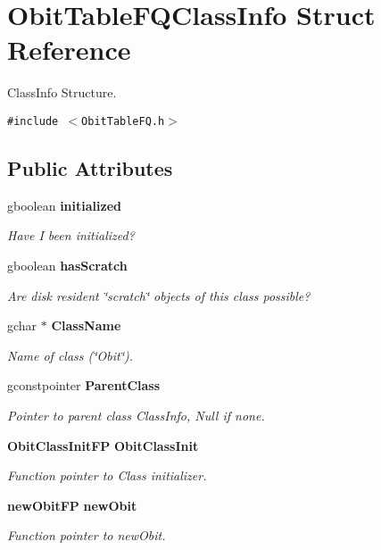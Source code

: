 \section{Obit\-Table\-FQClass\-Info Struct Reference}
\label{structObitTableFQClassInfo}
Class\-Info Structure.  


{\tt \#include $<$Obit\-Table\-FQ.h$>$}

\subsection*{Public Attributes}
\begin{CompactItemize}
\item 
gboolean {\bf initialized}
\begin{CompactList}\small\item\em Have I been initialized? \item\end{CompactList}\item 
gboolean {\bf has\-Scratch}
\begin{CompactList}\small\item\em Are disk resident \char`\"{}scratch\char`\"{} objects of this class possible? \item\end{CompactList}\item 
gchar $\ast$ {\bf Class\-Name}
\begin{CompactList}\small\item\em Name of class (\char`\"{}Obit\char`\"{}). \item\end{CompactList}\item 
gconstpointer {\bf Parent\-Class}
\begin{CompactList}\small\item\em Pointer to parent class Class\-Info, Null if none. \item\end{CompactList}\item 
{\bf Obit\-Class\-Init\-FP} {\bf Obit\-Class\-Init}
\begin{CompactList}\small\item\em Function pointer to Class initializer. \item\end{CompactList}\item 
{\bf new\-Obit\-FP} {\bf new\-Obit}
\begin{CompactList}\small\item\em Function pointer to new\-Obit. \item\end{CompactList}\item 

\end{CompactItemize}
